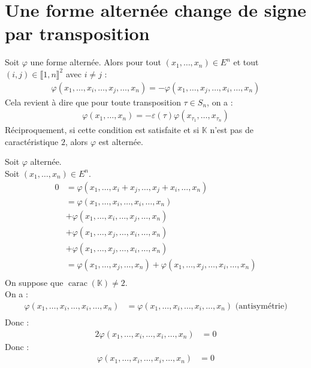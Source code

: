 \documentclass[../main.tex]{subfiles}
\begin{document}
\section{Une forme alternée change de signe par transposition}
\begin{tcolorbox}[title=Lemme 30.19, title filled=false, colframe=orange, colback=orange!10!white]
    Soit $\varphi$ une forme alternée. Alors pour tout $(x_1, \ldots, x_n)\in E^n$ et tout $(i, j)\in \llbracket 1, n \rrbracket^2$ avec $i\neq j$ :
    \begin{align*}
        \varphi(x_1, \ldots, x_i, \ldots, x_j, \ldots, x_n) = -\varphi(x_1, \ldots, x_j, \ldots, x_i, \ldots, x_n)
    \end{align*}
    Cela revient à dire que pour toute transposition $\tau\in S_n$, on a :
    \begin{align*}
        \varphi(x_1, \ldots, x_n) = -\varepsilon(\tau)\varphi(x_{\tau_1}, \ldots, x_{\tau_n})
    \end{align*}
    Réciproquement, si cette condition est satisfaite et si $\mathbb{K}$ n'est pas de caractéristique $2$, alors $\varphi$ est alternée.
\end{tcolorbox}

\noindent Soit $\varphi$ alternée. \\
Soit $(x_1, \ldots, x_n)\in E^n$. \\
\begin{align*}
    0 &= \varphi(x_1, \ldots, x_i + x_j, \ldots, x_j + x_i, \ldots, x_n) \\
    &= \varphi(x_1, \ldots, x_i, \ldots, x_i, \ldots, x_n) \\
    &+ \varphi(x_1, \ldots, x_i, \ldots, x_j, \ldots, x_n) \\
    &+ \varphi(x_1, \ldots, x_j, \ldots, x_i, \ldots, x_n) \\
    &+ \varphi(x_1, \ldots, x_j, \ldots, x_i, \ldots, x_n) \\
    &= \varphi(x_1, \ldots, x_j, \ldots, x_n) + \varphi(x_1, \ldots, x_j, \ldots, x_i, \ldots, x_n) \\
\end{align*}
On suppose que $\operatorname{carac}(\mathbb{K}) \neq 2$. \\
On a :
\begin{align*}
    \varphi(x_1, \ldots, x_i, \ldots, x_i, \ldots, x_n) &= \varphi(x_1, \ldots, x_i, \ldots, x_i, \ldots, x_n) \text{ (antisymétrie)} \\
\end{align*}
Donc : 
\begin{align*}
    2\varphi(x_1, \ldots, x_i, \ldots, x_i, \ldots, x_n) &= 0
\end{align*}
Donc : 
\begin{align*}
    \varphi(x_1, \ldots, x_i, \ldots, x_i, \ldots, x_n) &= 0
\end{align*}
\end{document}
